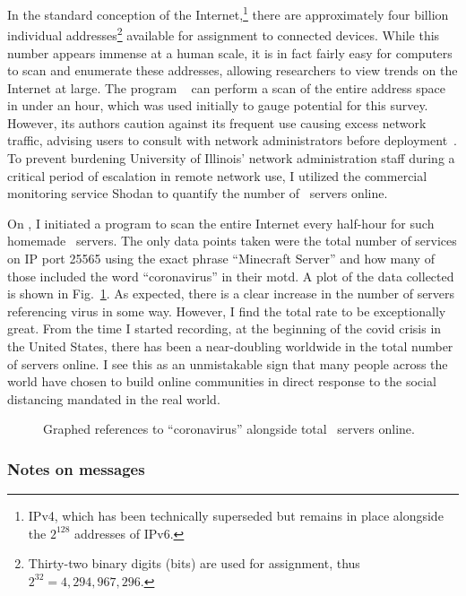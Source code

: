 \documentclass[2020/08/28 v2]{../../../coursework}
\newcommand{\mc}{\citetitle{Minecraft}}
\begin{document}
In the standard conception of the Internet,\footnote{IPv4, which has been technically superseded
but remains in place alongside the \(2^{128}\) addresses of IPv6.}
there are approximately four billion individual
addresses\footnote{Thirty-two binary digits (bits) are used for assignment, thus
\(2^{32} = 4,294,967,296\).}
available for assignment to connected devices. While this number appears
immense at a human scale, it is in fact fairly easy for computers to scan and
enumerate these addresses, allowing researchers to view trends on the Internet
at large. The program \ \parencite{zmap} can perform a scan of
the entire address space in under an hour, which was used initially to gauge
potential for this survey. However, its authors caution against its frequent use
causing excess network traffic, advising users to consult with network
administrators before deployment~\parencite{zmap-paper}.
To prevent burdening University of Illinois' network administration staff during
a critical period of escalation in remote network use, I utilized the
commercial monitoring service Shodan \parencite{Shodan} to quantify
the number of \mc\ servers online.

On , I initiated a program to scan the
entire Internet every half-hour for such homemade \mc\ servers.
The only data points taken were the total number of services on \ac{IP}
port 25565 using the exact phrase \enquote{Minecraft Server} and how many
of those included the word \enquote{coronavirus} in their \ac{motd}.
A plot of the data collected is shown in Fig.~\ref{fig:mcgraph}. As expected,
there is a clear increase in the number of servers referencing \ac{virus} in some way.
However, I find the total rate to be
exceptionally great. From the time I started recording, at the beginning of the
\ac{covid} crisis in the United States, there has been a near-doubling worldwide
in the total number of servers online. I see this as an unmistakable sign that
many people across the world have chosen to build online communities in direct
response to the social distancing mandated in the real world.

\begin{figure}%
	
	\caption{Graphed references to \enquote{coronavirus} alongside total \mc\ servers online.}
	\label{fig:mcgraph}
\end{figure}

\subsubsection{Notes on messages}
\end{document}
